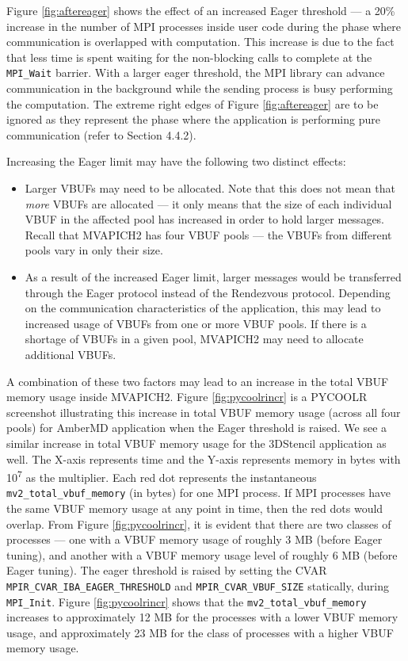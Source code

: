 \par Figure \ref{fig:aftereager} shows the effect of an increased Eager threshold --- a 20\% increase in the number of MPI processes inside user code during the phase where communication is overlapped with computation. This increase is due to the fact that less time is spent waiting for the non-blocking calls to complete at the \verb+MPI_Wait+ barrier. With a larger eager threshold, the MPI library can advance communication in the background while the sending process is busy performing the computation. The extreme right edges of Figure \ref{fig:aftereager} are to be ignored as they represent the phase where the application is performing pure communication (refer to Section 4.4.2).\par
Increasing the Eager limit may have the following two distinct effects:
\begin{itemize}
\item Larger VBUFs may need to be allocated. Note that this does not mean that \textit{more} VBUFs are allocated --- it only means that the size of each individual VBUF in the affected pool has increased in order to hold larger messages. Recall that MVAPICH2 has four VBUF pools --- the VBUFs from different pools vary in only their size. 
\item As a result of the increased Eager limit, larger messages would be transferred through the Eager protocol instead of the Rendezvous protocol. Depending on the communication characteristics of the application, this may lead to increased usage of VBUFs from one or more VBUF pools. If there is a shortage of VBUFs in a given pool, MVAPICH2 may need to allocate additional VBUFs.
\end{itemize}
A combination of these two factors may lead to an increase in the total VBUF memory usage inside MVAPICH2. Figure \ref{fig:pycoolrincr} is a PYCOOLR screenshot illustrating this increase in total VBUF memory usage (across all four pools) for AmberMD application when the Eager threshold is raised. We see a similar increase in total VBUF memory usage for the 3DStencil application as well. The X-axis represents time and the Y-axis represents memory in bytes with 10\textsuperscript{7} as the multiplier. Each red dot represents the instantaneous \verb+mv2_total_vbuf_memory+ (in bytes) for one MPI process. If MPI processes have the same VBUF memory usage at any point in time, then the red dots would overlap. From Figure \ref{fig:pycoolrincr}, it is evident that there are two classes of processes --- one with a VBUF memory usage of roughly 3 MB (before Eager tuning), and another with a VBUF memory usage level of roughly 6 MB (before Eager tuning). The eager threshold is raised by setting the CVAR \verb+MPIR_CVAR_IBA_EAGER_THRESHOLD+ and \verb+MPIR_CVAR_VBUF_SIZE+ statically, during \verb+MPI_Init+. Figure \ref{fig:pycoolrincr} shows that the \verb+mv2_total_vbuf_memory+ increases to approximately 12 MB for the processes with a lower VBUF memory usage, and approximately 23 MB for the class of processes with a higher VBUF memory usage. \par 

